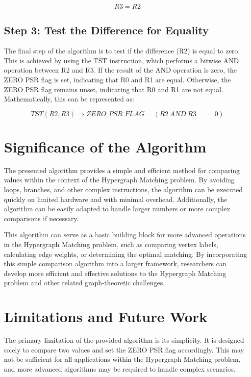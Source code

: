 \begin{equation}
    R3 = R2
\end{equation}

\subsection{Step 3: Test the Difference for Equality}

The final step of the algorithm is to test if the difference (R2) is equal to zero. This is achieved by using the TST instruction, which performs a bitwise AND operation between R2 and R3. If the result of the AND operation is zero, the ZERO PSR flag is set, indicating that R0 and R1 are equal. Otherwise, the ZERO PSR flag remains unset, indicating that R0 and R1 are not equal. Mathematically, this can be represented as:

\begin{equation}
    TST(R2, R3) \Rightarrow ZERO\_PSR\_FLAG = (R2 \ AND \ R3 == 0)
\end{equation}

\section{Significance of the Algorithm}

The presented algorithm provides a simple and efficient method for comparing values within the context of the Hypergraph Matching problem. By avoiding loops, branches, and other complex instructions, the algorithm can be executed quickly on limited hardware and with minimal overhead. Additionally, the algorithm can be easily adapted to handle larger numbers or more complex comparisons if necessary.

This algorithm can serve as a basic building block for more advanced operations in the Hypergraph Matching problem, such as comparing vertex labels, calculating edge weights, or determining the optimal matching. By incorporating this simple comparison algorithm into a larger framework, researchers can develop more efficient and effective solutions to the Hypergraph Matching problem and other related graph-theoretic challenges.

\section{Limitations and Future Work}

The primary limitation of the provided algorithm is its simplicity. It is designed solely to compare two values and set the ZERO PSR flag accordingly. This may not be sufficient for all applications within the Hypergraph Matching problem, and more advanced algorithms may be required to handle complex scenarios.

